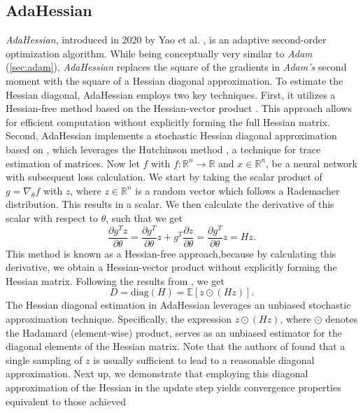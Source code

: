 \subsection{AdaHessian}
\label{sec:adahessian}
\emph{AdaHessian}, introduced in 2020 by Yao et al. \cite{yao2021adahessian}, is an adaptive second-order optimization algorithm.
While being conceptually very similar to \emph{Adam} (\ref{sec:adam}), \emph{AdaHessian} replaces the square of the gradients
in \emph{Adam's} second moment with the square of a Hessian diagonal approximation.
To estimate the Hessian diagonal, AdaHessian employs two key techniques.
First, it utilizes a Hessian-free method based on the Hessian-vector product \cite{pearlmutter1994fast}.
This approach allows for efficient computation without explicitly forming the full Hessian matrix.
Second, AdaHessian implements a stochastic Hessian diagonal approximation based on \cite{martens2015optimizing},
which leverages the Hutchinson method \cite{hutchinson}, a technique for trace estimation of matrices.
Now let $f$ with $f: \mathbb{R}^n \to \mathbb{R}$ and $x \in \mathbb{R}^n$, be a neural network with subsequent
loss calculation. We start by taking the scalar product of $g=\nabla_\theta f$ with $z$, where
$z\in \mathbb{R}^n$ is a random vector which follows a Rademacher distribution. This results in a scalar.
We then calculate the derivative of this scalar with respect to $\theta$, such that we get
\begin{equation}
 \frac{\partial g^T z}{\partial \theta} = \frac{\partial g^T}{\partial \theta} z + g^T \frac{\partial z}{\partial \theta} = \frac{\partial g^T}{\partial \theta} z = Hz.
\end{equation}
This method is known as a Hessian-free approach,because by calculating this derivative, we obtain a Hessian-vector product without explicitly forming the Hessian matrix.
Following the results from  \cite{martens2015optimizing}, we get
\begin{equation}
    D = \text{diag}(H) = \mathbb{E}[z \odot (Hz)].
\end{equation}
The Hessian diagonal estimation in AdaHessian leverages an unbiased stochastic approximation technique.
Specifically, the expression $z \odot (Hz)$, where $\odot$ denotes the Hadamard (element-wise) product, serves as an unbiased estimator for the diagonal elements of the Hessian matrix.
Note that the authors of \cite{yao2021adahessian} found that a single sampling of $z$ is usually sufficient to lead to a reasonable diagonal approximation.
Next up, we demonstrate that employing this diagonal approximation of the Hessian in the update step yields convergence properties equivalent to those achieved
